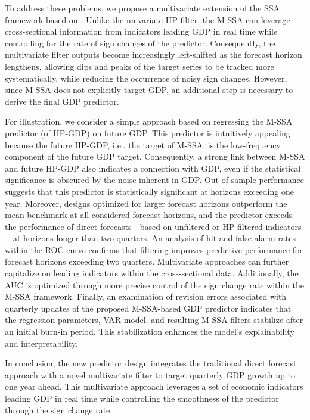\documentclass[11pt,a4paper]{article}
\begin{document}
To address these problems, we propose a multivariate extension of the SSA framework based on \cite{Wildi2024}. Unlike the univariate HP filter, the M-SSA can leverage cross-sectional information from indicators leading GDP in real time while controlling for the rate of sign changes of the predictor. Consequently, the multivariate filter outputs become increasingly left-shifted as the forecast horizon lengthens, allowing dips and peaks of the target series to be tracked more systematically, while reducing the occurrence of noisy sign changes. However, since M-SSA does not explicitly target GDP, an additional step is necessary to derive the final GDP predictor.%

For illustration, we consider a simple approach based on regressing the M-SSA predictor (of HP-GDP) on future GDP. This predictor is intuitively appealing because the future HP-GDP, i.e., the target of M-SSA, is the low-frequency component of the future GDP target. Consequently, a strong link between M-SSA and future HP-GDP also indicates a connection with GDP, even if the statistical significance is obscured by the noise inherent in GDP. Out-of-sample performance suggests that this predictor is statistically significant at horizons exceeding one year. Moreover, designs optimized for larger forecast horizons outperform the mean benchmark at all considered forecast horizons, and the predictor exceeds the performance of direct forecasts---based on unfiltered or HP filtered indicators---at horizons longer than two quarters. An analysis of hit and false alarm rates within the ROC curve confirms that filtering improves predictive performance for forecast horizons exceeding two quarters. Multivariate approaches can further capitalize on leading indicators within the cross-sectional data. Additionally, the AUC is optimized through more precise control of the sign change rate within the M-SSA framework. Finally, an examination of revision errors associated with quarterly updates of the proposed M-SSA-based GDP predictor indicates that the regression parameters, VAR model, and resulting M-SSA filters stabilize after an initial burn-in period. This stabilization enhances the model’s explainability and interpretability.

In conclusion, the new predictor design integrates the traditional direct forecast approach with a novel multivariate filter to target quarterly GDP growth up to one year ahead. This multivariate approach leverages a set of economic indicators leading GDP in real time while controlling the smoothness of the predictor through the sign change rate. 
\end{document}
